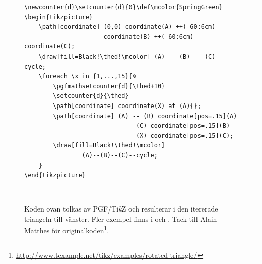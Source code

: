 \documentclass[swe,12pt]{skrapport}
\newcommand\PGFTikZ{PGF/Ti\emph{k}Z}					%
\begin{document}
	\begin{figure}[p]
		\centering
		\begin{minipage}{0.95\textwidth} %
			\vfil
			\begin{verbatim}
\newcounter{d}\setcounter{d}{0}\def\mcolor{SpringGreen}
\begin{tikzpicture}
    \path[coordinate] (0,0) coordinate(A) ++( 60:6cm)
                      coordinate(B) ++(-60:6cm) coordinate(C);
    \draw[fill=Black!\thed!\mcolor] (A) -- (B) -- (C) -- cycle;
    \foreach \x in {1,...,15}{%
        \pgfmathsetcounter{d}{\thed+10}
        \setcounter{d}{\thed}
        \path[coordinate] coordinate(X) at (A){};
        \path[coordinate] (A) -- (B) coordinate[pos=.15](A)
                            -- (C) coordinate[pos=.15](B)
                            -- (X) coordinate[pos=.15](C);
        \draw[fill=Black!\thed!\mcolor]
				(A)--(B)--(C)--cycle;
    }
\end{tikzpicture}
			\end{verbatim}
			\vfil
		\end{minipage}
		\\[1ex]
		\begin{minipage}{0.95\textwidth} %
			\centering
			\setcounter{density}{0}
			\begin{minipage}{0.475\textwidth}
			\end{minipage}\hfil
			\begin{minipage}{0.475\textwidth}
			\caption[Koden ovan tolkas av \PGFTikZ{} och resulterar i den
			itererade triangeln till vänster]{
			Koden ovan tolkas av \PGFTikZ{} och resulterar i den
			itererade triangeln till vänster.
			Fler exempel finns i
			 och . Tack till Alain 
			Matthes för originalkoden\footnote{\url{http://www.texample.net/tikz/examples/rotated-triangle/}}.}
			\label{fig:tikz}
			\end{minipage}
		\end{minipage}
	\end{figure}
	
\end{document}
